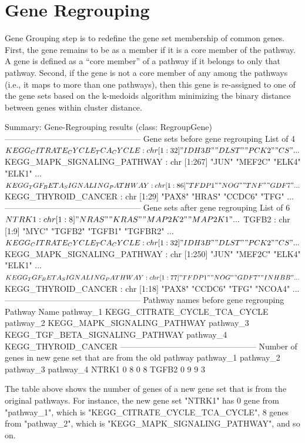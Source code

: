 \documentclass[11pt]{article}
\begin{document}
\section{Gene Regrouping}
Gene Grouping step is to redefine the gene set membership of common genes. First, the gene remains to be as a member if it is a core member of the pathway.  A gene is defined as a “core
member” of a pathway if it belongs to only that pathway.  Second, if the gene is not a core member of any among the pathways (i.e., it maps to more than one pathways), then this gene is re-assigned to one of the gene sets based on the k-medoids algorithm minimizing the binary distance between genes within cluster distance.

\begin{Schunk}
\begin{Soutput}
Summary: Gene-Regrouping results (class: RegroupGene)
--------------------------------------------------
Gene sets before gene regrouping
List of 4
 $ KEGG_CITRATE_CYCLE_TCA_CYCLE   : chr [1:32] "IDH3B" "DLST" "PCK2" "CS" ...
 $ KEGG_MAPK_SIGNALING_PATHWAY    : chr [1:267] "JUN" "MEF2C" "ELK4" "ELK1" ...
 $ KEGG_TGF_BETA_SIGNALING_PATHWAY: chr [1:86] "TFDP1" "NOG" "TNF" "GDF7" ...
 $ KEGG_THYROID_CANCER            : chr [1:29] "PAX8" "HRAS" "CCDC6" "TFG" ...
--------------------------------------------------
Gene sets after gene regrouping
List of 6
 $ NTRK1                          : chr [1:8] "NRAS" "KRAS" "MAP2K2" "MAP2K1" ...
 $ TGFB2                          : chr [1:9] "MYC" "TGFB2" "TGFB1" "TGFBR2" ...
 $ KEGG_CITRATE_CYCLE_TCA_CYCLE   : chr [1:32] "IDH3B" "DLST" "PCK2" "CS" ...
 $ KEGG_MAPK_SIGNALING_PATHWAY    : chr [1:250] "JUN" "MEF2C" "ELK4" "ELK1" ...
 $ KEGG_TGF_BETA_SIGNALING_PATHWAY: chr [1:77] "TFDP1" "NOG" "GDF7" "INHBB" ...
 $ KEGG_THYROID_CANCER            : chr [1:18] "PAX8" "CCDC6" "TFG" "NCOA4" ...
--------------------------------------------------
Pathway names before gene regrouping
                             Pathway Name
pathway_1    KEGG_CITRATE_CYCLE_TCA_CYCLE
pathway_2     KEGG_MAPK_SIGNALING_PATHWAY
pathway_3 KEGG_TGF_BETA_SIGNALING_PATHWAY
pathway_4             KEGG_THYROID_CANCER
--------------------------------------------------
Number of genes in new gene set that are from the old pathway
      pathway_1 pathway_2 pathway_3 pathway_4
NTRK1         0         8         0         8
TGFB2         0         9         9         3
\end{Soutput}
\end{Schunk}
The table above shows the number of genes of a new gene set that is from the original pathways. For instance, the new gene set "NTRK1" has 0 gene from "pathway_1", which is "KEGG_CITRATE_CYCLE_TCA_CYCLE", 8 genes from "pathway_2", which is "KEGG_MAPK_SIGNALING_PATHWAY", and so on.
\end{document}
